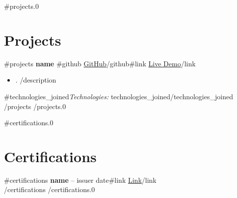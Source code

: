 \documentclass[11pt,a4paper]{article}
\begin{document}
{{#projects.0}}
\section{Projects}
 {{#projects}}
\textbf{ {{name}} }{{#github}} \hfill \href{ {{github}} }{GitHub}{{/github}}{{#link}} \hfill \href{ {{link}} }{Live Demo}{{/link}}\\
\begin{itemize}[leftmargin=*,nosep]
 {{#description}}
    \item {{.}}
 {{/description}}
\end{itemize}
 {{#technologies_joined}}\textit{Technologies:} {{technologies_joined}}{{/technologies_joined}}
 {{/projects}}
{{/projects.0}}

{{#certifications.0}}
\section{Certifications}
 {{#certifications}}
\textbf{ {{name}} } -- {{issuer}} \hfill {{date}}{{#link}} \hfill \href{ {{link}} }{Link}{{/link}}\\
 {{/certifications}}
{{/certifications.0}}
\end{document}

